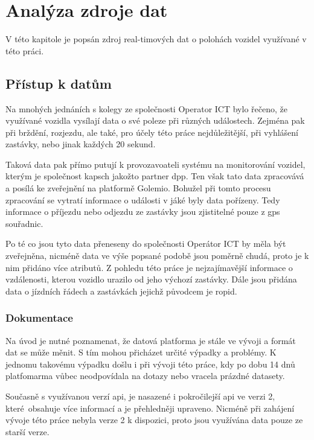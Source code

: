\newcommand{\documentationAtt}[2] {#1 #2}

\chapter{Analýza zdroje dat}

V této kapitole je popsán zdroj real-timových dat o polohách vozidel využívané v této práci.

\section{Přístup k datům}

Na mnohých jednáních s kolegy ze společnosti Operator ICT bylo řečeno, že využívané vozidla vysílají data o své poleze při různých událostech. Zejména pak při brždění, rozjezdu, ale také, pro účely této práce nejdůležitější, při vyhlášení zastávky, nebo jinak každých 20 sekund.

\bigbreak

Taková data pak přímo putují k provozavoateli systému na monitorování vozidel, kterým je společnost \gls{kapsch} jakožto partner \gls{dpp}. Ten však tato data zpracovává a posílá ke zveřejnění na platformě Golemio. Bohužel při tomto procesu zpracování se vytratí informace o události v jáké byly data pořízeny. Tedy informace o příjezdu nebo odjezdu ze zastávky jsou zjistitelné pouze z \gls{gps} souřadnic.

\bigbreak

Po té co jsou tyto data přeneseny do společnosti Operátor ICT by měla být zveřejněna, nicméně data ve výše popsané podobě jsou poměrně chudá, proto je k nim přidáno více atributů. Z pohledu této práce je nejzajímavější informace o vzdálenosti, kterou vozidlo urazilo od jeho výchozí zastávky. Dále jsou přidána data o jízdních řádech a zastávkách jejichž původcem je \gls{ropid}.

\subsection{Dokumentace}

Na úvod je nutné poznamenat, že datová platforma je stále ve vývoji a formát dat se může měnit. S tím mohou přicházet určité výpadky a problémy. K jednomu takovému výpadku došlu i při vývoji této práce, kdy po dobu 14 dnů platfomarma vůbec neodpovídala na dotazy nebo vracela prázdné datasety.

\bigbreak

Současně s využívanou verzí \gls{api}, je nasazené i pokročilejší \gls{api} ve verzi 2, které obsahuje více informací a je přehledněji upraveno. Nicméně při zahájení vývoje této práce nebyla verze 2 k dispozici, proto jsou využívána data pouze ze starší verze.

